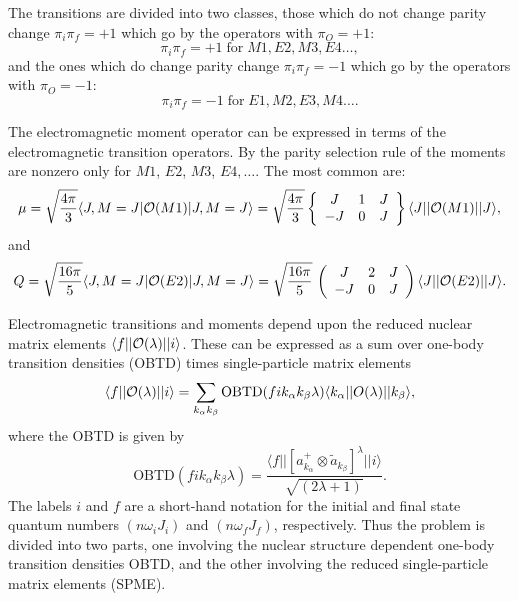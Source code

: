 \documentclass[graybox,sectrefs,envcountresetchap,open=right]{svmonodo}
\begin{document}
The transitions are divided into two classes, those
which do not change parity change $\pi _{i}\pi _{f}=+1$ which go by the
operators with $\pi _{O}=+1$:
\[
\pi _{i}\pi _{f}=+1 \; \mathrm{for} \; M1, E2, M3, E4 \dots,
\]
and the ones which do change parity change $\pi _{i}\pi _{f}=-1$
which go by the operators with $\pi _{O}=-1$:
\[
\pi _{i}\pi _{f}=-1 \; \mathrm{for} \; E1, M2, E3, M4 \dots.
\]



The 
electromagnetic moment operator can be expressed in terms of the
electromagnetic transition operators.
By the parity selection rule of the moments are nonzero
only for $M1$, $E2$, $M3$, $E4,\ldots$.
The most common are:
\[
\mu =\sqrt{\frac{4\pi }{3}}\langle J,M=J\vert {\cal O}(M1)\vert J,M=J\rangle= \sqrt{\frac{4\pi }{3}}\left\{\begin{array}{ccc} J & 1 &J \\  -J &  0 &  J \end{array}\right\}
\langle J\vert \vert {\cal O}(M1)\vert \vert J\rangle,
\]
and
\[
Q = \sqrt{\frac{16\pi }{5}}\langle J,M=J\vert {\cal O}(E2)\vert J,M=J\rangle= \sqrt{\frac{16\pi }{5}}\,
  \left(\begin{array}{ccc}  {J}&  {2} & {J}\\  {-J} & {0}&  {J}\end{array}\right)\langle J\vert\vert {\cal O}(E2)\vert\vert J\rangle.
\]


Electromagnetic transitions and moments depend upon the reduced nuclear
matrix elements $\langle f\vert\vert {\cal O}(\lambda )\vert\vert i\rangle$. These can be expressed as a sum over one-body transition
densities (OBTD) times single-particle matrix elements
\[
\langle f\vert\vert {\cal O}(\lambda )\vert\vert i\rangle
=\sum _{k_{\alpha } k_{\beta }}\mathrm{OBTD}(f i k_{\alpha } k_{\beta } \lambda )
 \langle k_{\alpha }\vert\vert O(\lambda )\vert\vert k_{\beta }\rangle, 
\]
where the OBTD is given by
\[
\mathrm{OBTD}(f i k_{\alpha} k_{\beta}\lambda)= \frac{\langle f\vert\vert [a^{+}_{k_{\alpha }}\otimes \tilde{a}_{k_{\beta }}]^{\lambda }\vert\vert i\rangle}{\sqrt{(2\lambda +1)}}. 
\]
The labels $i$ and $f$ are a short-hand notation for the initial
and final state quantum numbers $(n \omega _{i}J_{i})$ and $(n\omega_{f}J_{f})$,
respectively. Thus the problem is divided into two parts, one
involving the nuclear structure dependent one-body transition
densities OBTD, and the other involving the reduced
single-particle matrix
elements (SPME).
\end{document}
